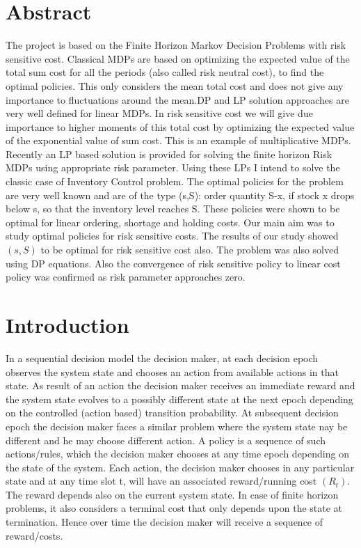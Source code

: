\documentclass[11pt,a4paper,oneside]{report}
\date{}
\begin{document}


\chapter*{Abstract}
The project is based on the Finite Horizon Markov Decision Problems with risk sensitive cost. Classical MDPs are based on optimizing the expected value of the total sum cost for all the periods (also called risk neutral cost), to find the optimal policies. This only considers the mean total cost and does not give any importance to fluctuations around the mean.DP and LP solution approaches are very  well  defined for linear MDPs. In risk sensitive cost we will give due importance to higher moments of this total cost by optimizing the expected value of the exponential value of sum cost. This is an example of multiplicative MDPs. Recently an LP based solution is provided for solving the finite horizon Risk MDPs using appropriate risk parameter. Using these LPs I intend to solve the classic case of Inventory Control problem. The optimal policies for the problem are very well known and are of the type (s,S): order quantity S-x, if stock x drops below s, so that the inventory level reaches S. These policies were shown to be optimal for linear ordering, shortage and holding costs. Our main aim  was to study optimal policies for risk sensitive costs. The results of our study showed $(s,S)$ to be optimal for risk sensitive cost also. The problem was also solved using DP equations.  Also the convergence of risk sensitive policy to linear cost policy was confirmed as risk parameter approaches zero.
\tableofcontents
\listoftables
\listoffigures
\chapter{Introduction}

In a sequential decision model the decision maker, at each decision epoch observes the system state and chooses an action from available actions in that state. As result of an action the decision maker receives an immediate reward and the system state evolves to a possibly different state at the next epoch depending on the controlled (action based) transition probability. At subsequent decision epoch the decision maker faces a similar problem where the system state nay be different and he may choose different action. A policy is a sequence of such actions/rules, which the decision maker chooses at any time epoch depending on the state of the system. Each action, the decision maker chooses in any particular state and at any time slot t, will have an associated reward/running cost $(R_t)$. The reward depends also on the current system state. In case of finite horizon problems, it also considers a terminal cost that only depends upon the state at termination. Hence over time the decision maker will receive a sequence of reward/costs.\\
\end{document}
